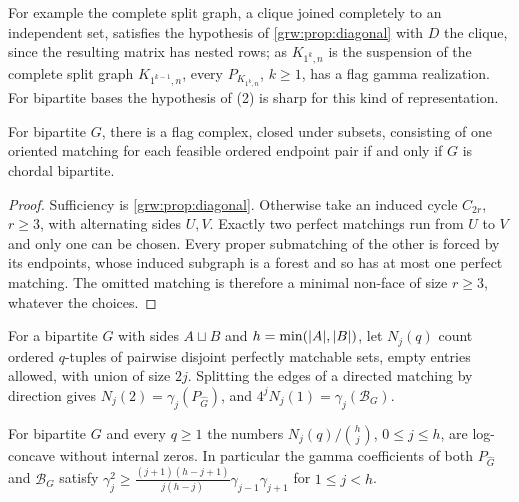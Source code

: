 For example the complete split graph, a clique joined completely to an
independent set, satisfies the hypothesis of \cref{grw:prop:diagonal} with
$D$ the clique, since the resulting matrix has nested rows; as $K_{1^k,n}$ is
the suspension of the complete split graph $K_{1^{k-1},n}$, every
$P_{K_{1^k,n}}$, $k\ge1$, has a flag gamma realization. For bipartite bases
the hypothesis of (2) is sharp for this kind of representation.

\begin{theorem}\label{grw:thm:flagiff}
For bipartite $G$, there is a flag complex, closed under subsets, consisting
of one oriented matching for each feasible ordered endpoint pair if and only
if $G$ is chordal bipartite.
\end{theorem}

\begin{proof}
Sufficiency is \cref{grw:prop:diagonal}. Otherwise take an induced cycle
$C_{2r}$, $r\ge3$, with alternating sides $U,V$. Exactly two perfect
matchings run from $U$ to $V$ and only one can be chosen. Every proper
submatching of the other is forced by its endpoints, whose induced subgraph
is a forest and so has at most one perfect matching. The omitted matching is
therefore a minimal non-face of size $r\ge3$, whatever the choices.
\end{proof}

For a bipartite $G$ with sides $A\sqcup B$ and $h=\min(\lvert A\rvert,\lvert B\rvert)$, let
$N_j(q)$ count ordered $q$-tuples of pairwise disjoint perfectly matchable
sets, empty entries allowed, with union of size $2j$. Splitting the edges of
a directed matching by direction gives $N_j(2)=\gamma_j(P_{\widehat G})$, and
$4^jN_j(1)=\gamma_j(\mathcal B_G)$.

\begin{theorem}\label{grw:thm:newton}
For bipartite $G$ and every $q\ge1$ the numbers $N_j(q)/\binom hj$,
$0\le j\le h$, are log-concave without internal zeros. In particular the
gamma coefficients of both $P_{\widehat G}$ and $\mathcal B_G$ satisfy
$\gamma_j^2\ge\frac{(j+1)(h-j+1)}{j(h-j)}\gamma_{j-1}\gamma_{j+1}$ for
$1\le j<h$.
\end{theorem}

